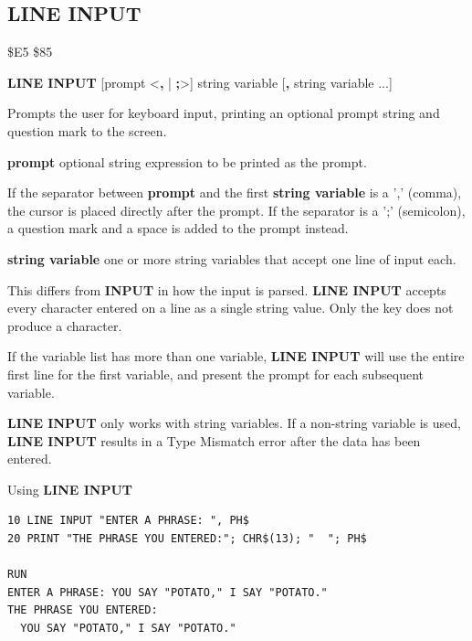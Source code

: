 \subsection{LINE INPUT}
\begin{description}[leftmargin=2cm,style=nextline]
\item [Token:]    \$E5 \$85
\item [Format:]   {\bf LINE INPUT} [prompt <{\bf,} | {\bf;}>] string variable [{\bf,} string variable ...]
\item [Usage:]    Prompts the user for keyboard input, printing an optional prompt string and question mark to the screen.

                  {\bf prompt} optional string expression to be printed as the prompt.

                  If the separator between {\bf prompt} and the first {\bf string variable} is a ',' (comma), the cursor is placed directly after the prompt. If the separator is a ';' (semicolon), a question mark and a space is added to the prompt instead.

                  {\bf string variable} one or more string variables that accept one line of input each.

\item [Remarks:]  This differs from {\bf INPUT} in how the input is parsed. {\bf LINE INPUT} accepts every character entered on a line as a single string value. Only the  key does not produce a character.

                  If the variable list has more than one variable, {\bf LINE INPUT} will use the entire first line for the first variable, and present the  prompt for each subsequent variable.

                  {\bf LINE INPUT} only works with string variables. If a non-string variable is used, {\bf LINE INPUT} results in a Type Mismatch error after the data has been entered.

\item [Example:]  Using {\bf LINE INPUT}

\begin{tcolorbox}[colback=black,coltext=white]
\verbatimfont{\codefont}
\begin{verbatim}
10 LINE INPUT "ENTER A PHRASE: ", PH$
20 PRINT "THE PHRASE YOU ENTERED:"; CHR$(13); "  "; PH$

RUN
ENTER A PHRASE: YOU SAY "POTATO," I SAY "POTATO."
THE PHRASE YOU ENTERED:
  YOU SAY "POTATO," I SAY "POTATO."
\end{verbatim}
\end{tcolorbox}
\end{description}

